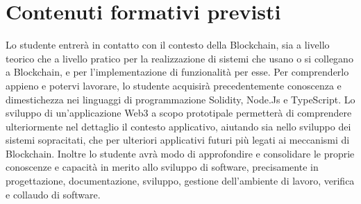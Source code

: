 \section*{Contenuti formativi previsti}
Lo studente entrerà in contatto con il contesto della Blockchain, sia a livello teorico che a livello pratico per la realizzazione di sistemi che usano o si collegano a Blockchain, e per l'implementazione di funzionalità per esse. Per comprenderlo appieno e potervi lavorare, lo studente acquisirà precedentemente conoscenza e dimestichezza nei linguaggi di programmazione Solidity, Node.Js e TypeScript. Lo sviluppo di un’applicazione Web3 a scopo prototipale permetterà di comprendere ulteriormente nel dettaglio il contesto applicativo, aiutando sia nello sviluppo dei sistemi sopracitati, che per ulteriori applicativi futuri più legati ai meccanismi di Blockchain. Inoltre lo studente avrà modo di approfondire e consolidare le proprie conoscenze e capacità in merito allo sviluppo di software, precisamente in progettazione, documentazione, sviluppo, gestione dell'ambiente di lavoro, verifica e collaudo di software.
\newpage